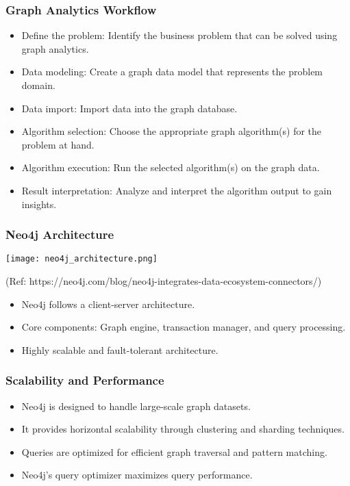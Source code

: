 \begin{frame}[fragile]\frametitle{Graph Analytics Workflow}
  \begin{itemize}
    \item Define the problem: Identify the business problem that can be solved using graph analytics.
    \item Data modeling: Create a graph data model that represents the problem domain.
    \item Data import: Import data into the graph database.
    \item Algorithm selection: Choose the appropriate graph algorithm(s) for the problem at hand.
    \item Algorithm execution: Run the selected algorithm(s) on the graph data.
    \item Result interpretation: Analyze and interpret the algorithm output to gain insights.
  \end{itemize}
\end{frame}



\begin{frame}[fragile]\frametitle{Neo4j Architecture}
  \begin{center}
    \texttt{[image: neo4j\_architecture.png]}
	
	{\tiny (Ref: https://neo4j.com/blog/neo4j-integrates-data-ecosystem-connectors/)}
	
  \end{center}
  \begin{itemize}
    \item Neo4j follows a client-server architecture.
    \item Core components: Graph engine, transaction manager, and query processing.
    \item Highly scalable and fault-tolerant architecture.
  \end{itemize}
\end{frame}


\begin{frame}[fragile]\frametitle{Scalability and Performance}
  \begin{itemize}
    \item Neo4j is designed to handle large-scale graph datasets.
    \item It provides horizontal scalability through clustering and sharding techniques.
    \item Queries are optimized for efficient graph traversal and pattern matching.
    \item Neo4j's query optimizer maximizes query performance.
  \end{itemize}
\end{frame}

